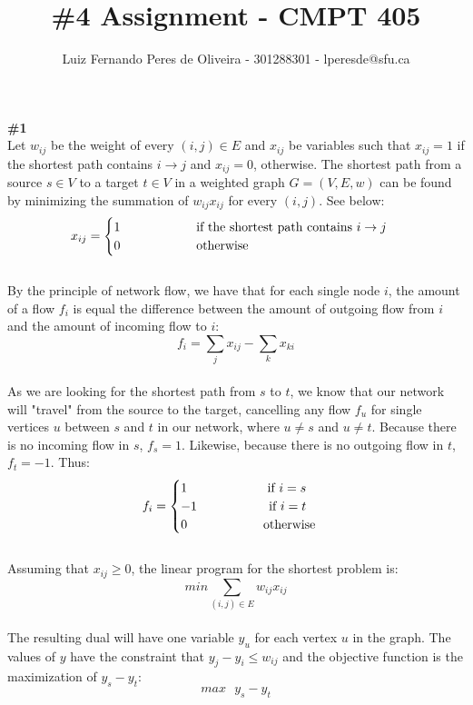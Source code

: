 \documentclass{article}
\title{\#4 Assignment - CMPT 405}
\author{Luiz Fernando Peres de Oliveira - 301288301 - lperesde@sfu.ca}
\newcommand\tab[1][1cm]{\hspace*{#1}}
\begin{document}
\maketitle
\textbf{\#1}
\\
Let $w_{ij}$ be the weight of every $(i, j) \in E$ and $x_{ij}$ be variables such that $x_{ij} = 1$ if the shortest path contains $i \rightarrow j$ and $x_{ij} = 0$, otherwise. The shortest path from a source $s \in V$ to a target $t \in V$ in a weighted graph $G=(V, E, \textit{w})$ can be found by minimizing the summation of $w_{ij}x_{ij}$ for every $(i, j)$. See below:
\begin{gather*}
x_{ij} =
\begin{cases}
1 \tab\tab\text{ if the shortest path contains } i \rightarrow j \\
0 \tab\tab\text{ otherwise}\\
\end{cases}
\end{gather*}
\\
By the principle of network flow, we have that for each single node $i$, the amount of a flow $f_i$ is equal the difference between the amount of outgoing flow from $i$ and the amount of incoming flow to $i$:
$$
f_i = \sum_{j}x_{ij} - \sum_{k} x_{ki}
$$
\\
As we are looking for the shortest path from $s$ to $t$, we know that our network will "travel" from the source to the target, cancelling any flow $f_u$ for single vertices $u$ between $s$ and $t$ in our network, where $u \neq s$ and $u \neq t$. Because there is no incoming flow in $s$, $f_s = 1$. Likewise, because there is no outgoing flow in $t$, $f_t = -1$. Thus:
\begin{gather*}
f_i =
\begin{cases}
1 \text{ } \tab\tab\text{ if } i = s\\
-1 \tab\tab\text{if } i = t\\
0 \tab\tab\text{ otherwise}
\end{cases}
\end{gather*}
\\
Assuming that $x_{ij} \geq 0$, the linear program for the shortest problem is:
$$
min \sum_{(i, j) \in E} w_{ij}x_{ij}
$$
\\
The resulting dual will have one variable $y_u$ for each vertex $u$ in the  graph. The values of $y$ have the constraint that $y_j - y_i \leq w_{ij}$ and the objective function is the maximization of $y_s - y_t$:
\\
$$
max \text{ } y_s - y_t
$$
\end{document}
